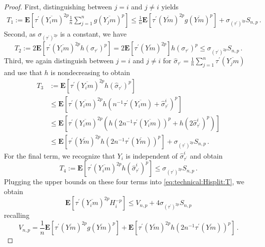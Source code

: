 \documentclass{article}
\newcommand{\lab}{\left[} %
\newcommand{\rab}{\right]} %
\newcommand{\ab}[1]{\lab #1 \rab} %
\newcommand{\abOf}[1]{\!\ab{#1}} %
\newcommand{\lb}{\left(} %
\newcommand{\rb}{\right)} %
\newcommand{\br}[1]{\lb #1 \rb} %
\newcommand{\E}{\mathbf{E}} %
\newcommand{\EOf}[1]{\E\abOf{#1}}
\newcommand{\pr}{^\prime}
\newcommand{\eqfs}{\,.}
\newcommand{\ol}[2]{\overline{#1#2}}
\newcommand{\dtran}{\tau\pr}
\begin{document}
\begin{proof}
    First, distinguishing between $j=i$ and $j\neq i$ yields
    \begin{align}
        T_1 
        := 
        \EOf{\dtran(\ol{Y_i}m)^{2p} \frac1n \sum_{j=1}^n g(\ol{Y_j}{m})^p} 
        \leq
        \frac1n  \EOf{\dtran(\ol{Y}m)^{2p} g(\ol{Y}{m})^p} + \sigma_{(\dtran)^{2p}} S_{n,p}
        \eqfs
    \end{align}
    Second, as $\sigma_{(\dtran)^{2p}}$ is a constant, we have
    \begin{equation}
        T_2 
        := 
        2\EOf{\dtran(\ol{Y_i}m)^{2p} h(\sigma_{\dtran})^p} 
        =
        2\EOf{\dtran(\ol{Y}m)^{2p}} h(\sigma_{\dtran})^p
        \leq
        \sigma_{(\dtran)^{2p}} S_{n,p}
        \eqfs
    \end{equation}
    Third, we again distinguish between $j=i$ and $j\neq i$ for $\hat\sigma_{\dtran} = \frac1n\sum_{j=1}^n \dtran(\ol {Y_j}m)$ and use that $h$ is nondecreasing to obtain
    \begin{align}
        T_3 
        &:= 
        \EOf{\dtran(\ol{Y_i}m)^{2p} h(\hat\sigma_{\dtran})^p} 
        \\& \leq
        \EOf{\dtran(\ol{Y_i}m)^{2p} h(n^{-1} \dtran(\ol{Y_i}m)+\hat\sigma^i_{\dtran})^p} 
        \\& \leq
        \EOf{\dtran(\ol{Y_i}m)^{2p} \br{h(2n^{-1} \dtran(\ol{Y_i}m))^p+h(2\hat\sigma^i_{\dtran})^p} }
        \\&\leq
        \EOf{\dtran(\ol{Y}m)^{2p} h(2n^{-1} \dtran(\ol{Y}m))^p} + \sigma_{(\dtran)^{2p}} S_{n,p}
        \eqfs
    \end{align}
    For the final term, we recognize that $Y_i$ is independent of $\hat\sigma^i_{\dtran}$ and obtain
    \begin{equation}
        T_4 
        := 
        \EOf{\dtran(\ol{Y_i}m)^{2p} h(\hat\sigma^i_{\dtran})^p} 
        \leq
        \sigma_{(\dtran)^{2p}} S_{n,p}
        \eqfs
    \end{equation}
    Plugging the upper bounds on these four terms into \eqref{eq:technical:Hisplit:T}, we obtain
    \begin{equation}\label{eq:technical:Hipbound}
        \EOf{\dtran(\ol{Y_i}m)^{2p} H_i^{-p}} \leq V_{n,p} + 4 \sigma_{(\dtran)^{2p}} S_{n,p}
    \end{equation}
    recalling
    \begin{equation}
        V_{n,p} = \frac1n  \EOf{\dtran(\ol{Y}m)^{2p} g(\ol{Y}{m})^p}  + 	\EOf{\dtran(\ol{Y}m)^{2p} h(2n^{-1} \dtran(\ol{Y}m))^p}\eqfs
    \end{equation}

\end{proof}
\end{document}

